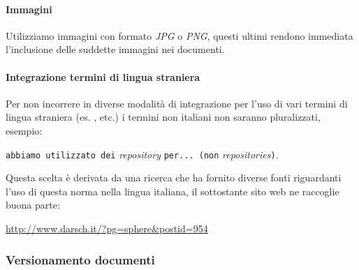 \documentclass{scalatekids-article}
\begin{document}
\paragraph{Immagini}

Utilizziamo immagini con formato \textit{JPG} o \textit{PNG}, questi ultimi rendono immediata l'inclusione delle suddette immagini nei documenti.

\paragraph{Integrazione termini di lingua straniera}

Per non incorrere in diverse modalità di integrazione per l'uso di vari termini
di lingua straniera (es. ,  etc.) i termini non italiani non saranno pluralizzati, esempio:\\
\begin{center}
  \verb=abbiamo utilizzato dei= \textit{repository} \verb=per... (non= \textit{repositories}\verb=)=.
\end{center}
Questa scelta è derivata da una ricerca che ha fornito diverse fonti riguardanti l'uso di questa norma nella lingua italiana, il sottostante sito web ne raccoglie buona parte:\\
\begin{center}
  \url{http://www.darsch.it/?pg=sphere&postid=954}
\end{center}

\subsubsection{Versionamento documenti}
\end{document}

